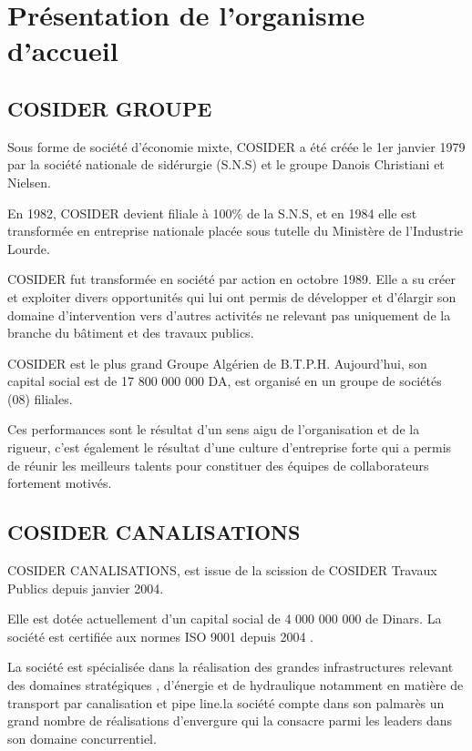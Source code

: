 \documentclass{report}
\begin{document}
\section{Présentation de l’organisme d’accueil}
\vspace*{0.2cm}
\subsection{COSIDER GROUPE}
Sous forme de société d’économie mixte, COSIDER a été créée le 1er janvier 1979 par la société nationale de sidérurgie (S.N.S) et le groupe Danois Christiani et Nielsen.

En 1982, COSIDER devient filiale à 100\% de la S.N.S, et en 1984 elle est transformée en entreprise nationale placée sous tutelle du Ministère de l’Industrie Lourde.

COSIDER fut transformée en société par action en octobre 1989.
Elle a su créer et exploiter divers opportunités qui lui ont permis de développer et d’élargir son domaine d’intervention vers d’autres activités ne relevant pas uniquement de la branche du bâtiment et des travaux publics.

COSIDER est le plus grand Groupe Algérien de B.T.P.H. Aujourd’hui, son capital social est de 17 800 000 000 DA, est organisé en un groupe de sociétés (08) filiales.

Ces performances sont le résultat d’un sens aigu de l’organisation et de la rigueur, c’est également le résultat d’une culture d’entreprise forte qui a permis de réunir les meilleurs talents pour constituer des équipes de collaborateurs fortement motivés. \cite{cosider}
\vspace*{0.5cm}
\subsection{COSIDER CANALISATIONS}
COSIDER CANALISATIONS, est issue de la scission de COSIDER Travaux Publics depuis janvier 2004.

Elle est dotée actuellement d’un capital social de 4 000 000 000 de Dinars.
La société est certifiée aux normes ISO 9001 depuis 2004 .

La société est spécialisée dans la réalisation des grandes infrastructures relevant des domaines stratégiques , d’énergie et de hydraulique notamment en matière de transport par canalisation et pipe line.la société compte dans son palmarès un grand nombre de réalisations d’envergure qui la consacre parmi les leaders dans son domaine concurrentiel.
\cite{cosider1}
\end{document}
